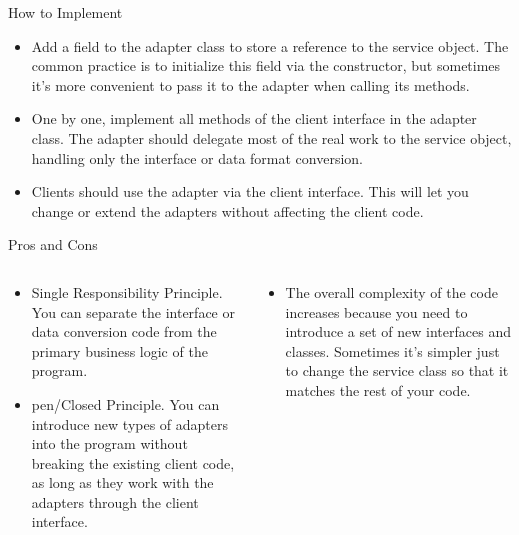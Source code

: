 \documentclass[13pt]{beamer}
\begin{document}
\begin{frame}{How to Implement}
	\begin{itemize}
		\setlength\itemsep{1em}
		\item Add a field to the adapter class to store a reference to the service object. The common practice is to initialize this field via the constructor, but sometimes it’s more convenient to pass it to the adapter when calling its methods.
		\item One by one, implement all methods of the client interface in the adapter class. The adapter should delegate most of the real work to the service object, handling only the interface or data format conversion.
		\item Clients should use the adapter via the client interface. This will let you change or extend the adapters without affecting the client code.
	\end{itemize}
\end{frame}

\begin{frame}{Pros and Cons}
	\begin{columns}[T]
		\begin{column}{.5\textwidth}
			\begin{itemize}
				\item  Single Responsibility Principle. You can separate the interface or data conversion code from the primary business logic of the program.
				\item pen/Closed Principle. You can introduce new types of adapters into the program without breaking the existing client code, as long as they work with the adapters through the client interface.
			\end{itemize}
		\end{column}
	
		\begin{column}{.5\textwidth}
			\begin{itemize}
				\item The overall complexity of the code increases because you need to introduce a set of new interfaces and classes. Sometimes it’s simpler just to change the service class so that it matches the rest of your code.
			\end{itemize}
		\end{column}
	\end{columns}
\end{frame}
\end{document}
